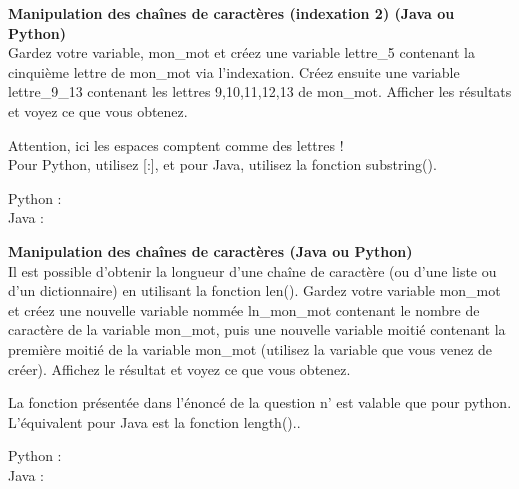 \begin{Exercice}[20 minutes] \textbf{Manipulation des chaînes de caractères (indexation 2) (Java ou Python)}\\
   Gardez votre variable, mon\_mot et créez une variable lettre\_5 contenant la cinquième lettre de mon\_mot via l'indexation. Créez ensuite une variable lettre\_9\_13 contenant les lettres 9,10,11,12,13 de mon\_mot. Afficher les résultats et voyez ce que vous obtenez.  \\
   
    \begin{conseil}
      	Attention, ici les espaces comptent comme des lettres ! \\

		Pour Python, utilisez [:], et pour Java, utilisez la fonction substring().
        
    \end{conseil}
    \begin{solution}
    
    Python : \\
    
    
    
    Java : \\
    
    
           
    \end{solution}   
\end{Exercice}

\begin{Exercice}[20 minutes] \textbf{Manipulation des chaînes de caractères (Java ou Python)}\\
   Il est possible d'obtenir la longueur d'une chaîne de caractère (ou d'une liste ou d'un dictionnaire) en utilisant la fonction len(). Gardez votre variable mon\_mot et créez une nouvelle variable nommée ln\_mon\_mot contenant le nombre de caractère de la variable mon\_mot, puis une nouvelle variable moitié contenant la première moitié de la variable mon\_mot (utilisez la variable que vous venez de créer). Affichez le résultat et voyez ce que vous obtenez.   \\
   
    \begin{conseil}
      	La fonction présentée dans l'énoncé de la question n' est valable que pour python. L'équivalent pour Java est la fonction length()..
        
    \end{conseil}
    \begin{solution}
    
    Python : \\
    
    
    
    Java : \\
    
    
           
    \end{solution}   
\end{Exercice}

